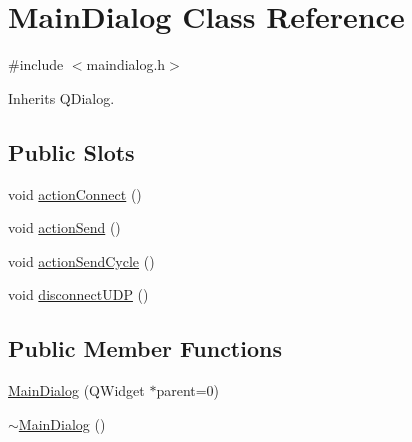 \hypertarget{class_main_dialog}{\section{Main\-Dialog Class Reference}
\label{class_main_dialog}
}


{\ttfamily \#include $<$maindialog.\-h$>$}



Inherits Q\-Dialog.

\subsection*{Public Slots}
\begin{DoxyCompactItemize}
\item 
void \hyperlink{class_main_dialog_a630ba9d7feac1f3223d3d598598dd6bf}{action\-Connect} ()
\item 
void \hyperlink{class_main_dialog_a0072f1863538413fe577b202e1534ad5}{action\-Send} ()
\item 
void \hyperlink{class_main_dialog_af13d1776e1e73e858766ee987f78869d}{action\-Send\-Cycle} ()
\item 
void \hyperlink{class_main_dialog_a674ca86596bb3a2643e6a9cee196df78}{disconnect\-U\-D\-P} ()
\end{DoxyCompactItemize}
\subsection*{Public Member Functions}
\begin{DoxyCompactItemize}
\item 
\hyperlink{class_main_dialog_ae908b2fb60d524f7c4690570ba1d6e3d}{Main\-Dialog} (Q\-Widget $\ast$parent=0)
\item 
\hyperlink{class_main_dialog_a33d8e8327530b31387876b19f6542cc5}{$\sim$\-Main\-Dialog} ()
\end{DoxyCompactItemize}


